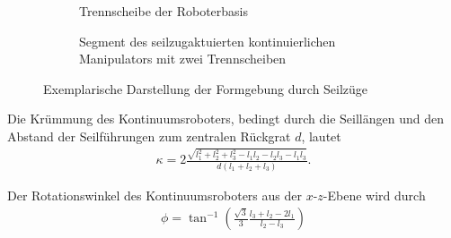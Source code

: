 \newsavebox{\imagebox} 
\begin{figure}[htb!]
\begin{subfigure}[t]{0.48\textwidth}
\centering\raisebox{\dimexpr.5\ht\imagebox-.5\height}{
	\def\svgwidth{\textwidth}
	
}
\caption{Trennscheibe der Roboterbasis}
\end{subfigure}
\begin{subfigure}[t]{0.48\textwidth}
\centering
\def\svgwidth{\textwidth}

\caption{Segment des seilzugaktuierten kontinuierlichen Manipulators mit zwei Trennscheiben}
\end{subfigure}
\caption[Exemplarische Darstellung der Formgebung durch Seilzüge]{Exemplarische Darstellung der Formgebung durch Seilzüge}
\label{fig:roboterDesign}
\end{figure}

Die Krümmung des Kontinuumsroboters, bedingt durch die Seillängen und den Abstand der Seilführungen zum zentralen Rückgrat $d$, lautet
\begin{align}
\kappa = 2\frac{\sqrt{l_1^2+l_2^2+l_3^2-l_1l_2-l_2l_3-l_1l_3}}{d(l_1+l_2+l_3)}.
\label{eq:kappa}
\end{align}

Der Rotationswinkel des Kontinuumsroboters aus der $x$-$z$-Ebene wird durch
\begin{align}
\phi = \tan^{-1}\left(\frac{\sqrt{3}}{3} \frac{l_3+l_2-2l_1}{l_2-l_3} \right)
\label{eq:phi}
\end{align}

